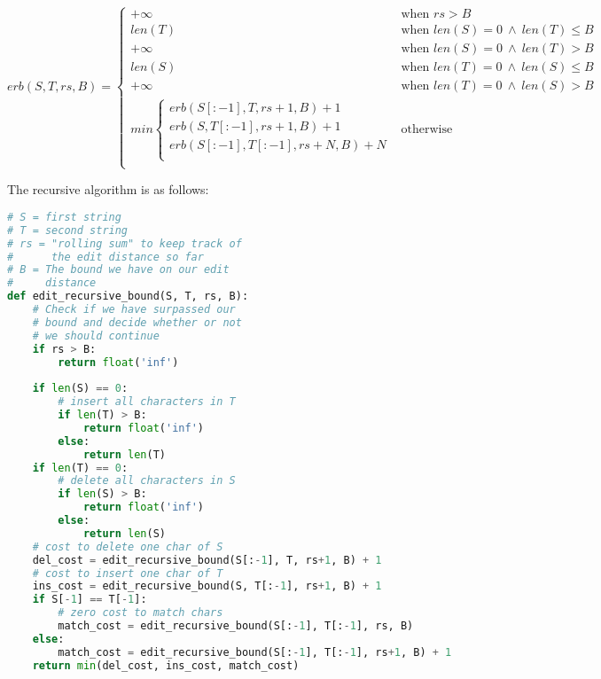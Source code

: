 \documentclass[11pt, letterpaper]{article}
\begin{document}
\begin{enumerate}
\[
erb(S, T, rs, B) = 
\begin{cases}
	+\infty &\text{when } rs > B \\
	len(T) & \text{when } len(S) = 0\ \wedge\ len(T) \leq B \\
	+\infty & \text{when } len(S) = 0\ \wedge\ len(T) > B \\
	len(S) & \text{when } len(T) = 0\ \wedge\ len(S) \leq B \\
	+\infty & \text{when } len(T) = 0\ \wedge\ len(S) > B \\
	min
	\begin{cases}
	erb(S[:-1], T, rs+1, B) + 1 \\
	erb(S, T[:-1], rs+1, B) + 1 \\
	erb(S[:-1], T[:-1], rs+N, B) + N \\
	\end{cases}
	& \text{otherwise} \\
\end{cases}
\]


\pagebreak

\begin{center}
The recursive algorithm is as follows:
\end{center}

\begin{lstlisting}[language=python]
# S = first string
# T = second string
# rs = "rolling sum" to keep track of 
#      the edit distance so far
# B = The bound we have on our edit
#     distance
def edit_recursive_bound(S, T, rs, B):
    # Check if we have surpassed our 
    # bound and decide whether or not
    # we should continue
    if rs > B:
        return float('inf')
    
    if len(S) == 0:
        # insert all characters in T
        if len(T) > B:
            return float('inf')
        else:
            return len(T)
    if len(T) == 0:
        # delete all characters in S
        if len(S) > B:
            return float('inf')
        else:
            return len(S)
    # cost to delete one char of S
    del_cost = edit_recursive_bound(S[:-1], T, rs+1, B) + 1
    # cost to insert one char of T
    ins_cost = edit_recursive_bound(S, T[:-1], rs+1, B) + 1
    if S[-1] == T[-1]:
        # zero cost to match chars
        match_cost = edit_recursive_bound(S[:-1], T[:-1], rs, B)
    else:
        match_cost = edit_recursive_bound(S[:-1], T[:-1], rs+1, B) + 1
    return min(del_cost, ins_cost, match_cost)
\end{lstlisting}

\pagebreak


\end{enumerate}
\end{document}
